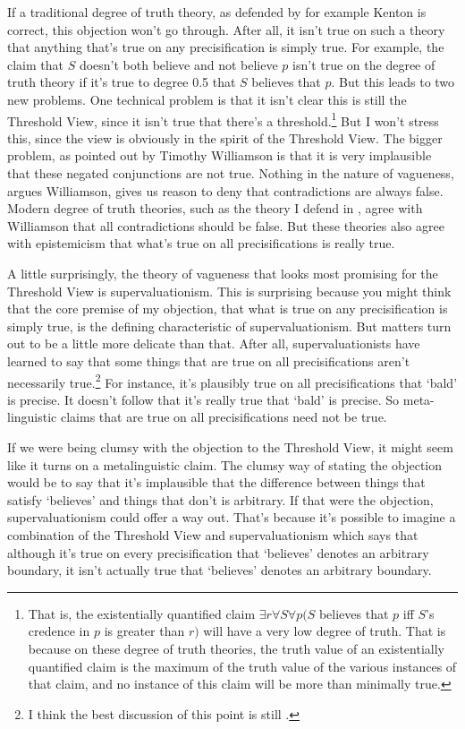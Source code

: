 If a traditional degree of truth theory, as defended by for example Kenton \cite{Machina1976} is correct, this objection won't go through. After all, it isn't true on such a theory that anything that's true on any precisification is simply true. For example, the claim that \(S\) doesn't both believe and not believe \(p\) isn't true on the degree of truth theory if it's true to degree 0.5 that \(S\) believes that \(p\). But this leads to two new problems. One technical problem is that it isn't clear this is still the Threshold View, since it isn't true that there's a threshold.\footnote{That is, the existentially quantified claim \(\exists r \forall S \forall p (S \) believes that \(p\) iff \(S\)'s credence in \(p\) is greater than \(r)\) will have a very low degree of truth. That is because on these degree of truth theories, the truth value of an existentially quantified claim is the maximum of the truth value of the various instances of that claim, and no instance of this claim will be more than minimally true.} But I won't stress this, since the view is obviously in the spirit of the Threshold View. The bigger problem, as pointed out by Timothy Williamson \citeyearpar[Ch. 4]{Williamson1994-WILV} is that it is very implausible that these negated conjunctions are not true. Nothing in the nature of vagueness, argues Williamson, gives us reason to deny that contradictions are always false. Modern degree of truth theories, such as the theory I defend in \cite{Weatherson2005-WEATTT}, agree with Williamson that all contradictions should be false. But these theories also agree with epistemicism that what's true on all precisifications is really true.

A little surprisingly, the theory of vagueness that looks most promising for the Threshold View is supervaluationism. This is surprising because you might think that the core premise of my objection, that what is true on any precisification is simply true, is the defining characteristic of supervaluationism. But matters turn out to be a little more delicate than that. After all, supervaluationists have learned to say that some things that are true on all precisifications aren't necessarily true.\footnote{I think the best discussion of this point is still \cite{Lewis1993c}.} For instance, it's plausibly true on all precisifications that `bald' is precise. It doesn't follow that it's really true that `bald' is precise. So meta-linguistic claims that are true on all precisifications need not be true.

If we were being clumsy with the objection to the Threshold View, it might seem like it turns on a metalinguistic claim. The clumsy way of stating the objection would be to say that it's implausible that the difference between things that satisfy `believes' and things that don't is arbitrary. If that were the objection, supervaluationism could offer a way out. That's because it's possible to imagine a combination of the Threshold View and supervaluationism which says that although it's true on every precisification that `believes' denotes an arbitrary boundary, it isn't actually true that `believes' denotes an arbitrary boundary.

